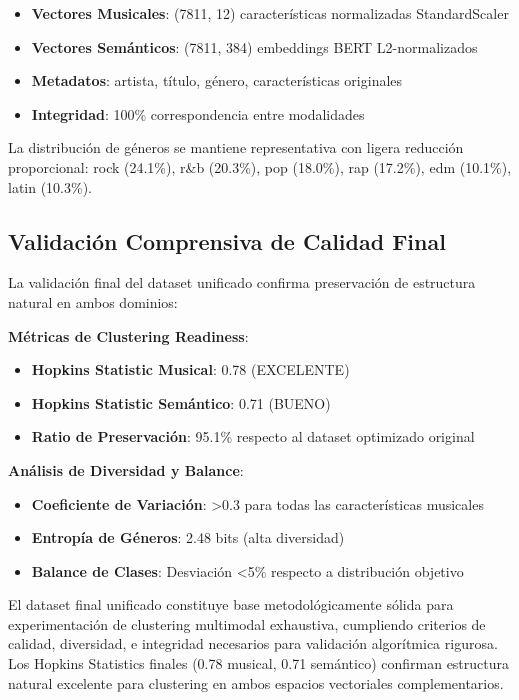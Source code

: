 \documentclass[12pt,a4paper]{report}
\begin{document}
\begin{itemize}
\item \textbf{Vectores Musicales}: (7811, 12) características normalizadas StandardScaler
\item \textbf{Vectores Semánticos}: (7811, 384) embeddings BERT L2-normalizados
\item \textbf{Metadatos}: artista, título, género, características originales
\item \textbf{Integridad}: 100\% correspondencia entre modalidades
\end{itemize}

La distribución de géneros se mantiene representativa con ligera reducción proporcional: rock (24.1\%), r\&b (20.3\%), pop (18.0\%), rap (17.2\%), edm (10.1\%), latin (10.3\%).

\subsection{Validación Comprensiva de Calidad Final}

La validación final del dataset unificado confirma preservación de estructura natural en ambos dominios:

\textbf{Métricas de Clustering Readiness}:
\begin{itemize}
\item \textbf{Hopkins Statistic Musical}: 0.78 (EXCELENTE)
\item \textbf{Hopkins Statistic Semántico}: 0.71 (BUENO)
\item \textbf{Ratio de Preservación}: 95.1\% respecto al dataset optimizado original
\end{itemize}

\textbf{Análisis de Diversidad y Balance}:
\begin{itemize}
\item \textbf{Coeficiente de Variación}: >0.3 para todas las características musicales
\item \textbf{Entropía de Géneros}: 2.48 bits (alta diversidad)
\item \textbf{Balance de Clases}: Desviación <5\% respecto a distribución objetivo
\end{itemize}

El dataset final unificado constituye base metodológicamente sólida para experimentación de clustering multimodal exhaustiva, cumpliendo criterios de calidad, diversidad, e integridad necesarios para validación algorítmica rigurosa. Los Hopkins Statistics finales (0.78 musical, 0.71 semántico) confirman estructura natural excelente para clustering en ambos espacios vectoriales complementarios.
\end{document}
